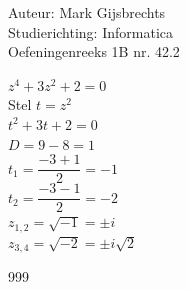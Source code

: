 \documentclass[a4paper]{article}
\begin{document}
\noindent \large Auteur: Mark Gijsbrechts \\
\noindent \large Studierichting: Informatica\\
\noindent \large Oefeningenreeks 1B nr. 42.2\\

\medskip

\normalsize



$z^4 + 3z^2 + 2 = 0$ \\

Stel $t = z^2$ \\

$t^2 + 3t + 2 = 0$ \\

$D = 9 - 8 = 1$ \\

$t_{1} = \dfrac{-3 + 1}{2} = -1$ \\ 

$t_{2} = \dfrac{-3 - 1}{2} = -2$ \\ 

$z_{1,2} = \sqrt{-1} = \pm i$ \\

$z_{3,4} = \sqrt{-2} = \pm i\sqrt{2}$ 


\begin{thebibliography}{999}
\end{thebibliography}
\end{document}

